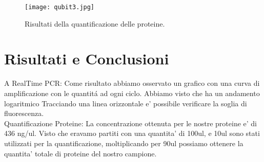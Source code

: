 \documentclass{article}
\begin{document}
\begin{figure}
  \texttt{[image: qubit3.jpg]}
  \caption{Risultati della quantificazione delle proteine.}
  \label{fig:qubit3}
\end{figure}

\section{Risultati e Conclusioni}
A
RealTime PCR:
Come risultato abbiamo osservato un grafico con una curva di amplificazione con le quantit\'a ad ogni ciclo.
Abbiamo visto che ha un andamento logaritmico
Tracciando una linea orizzontale e' possibile verificare la soglia di fluorescenza.\\

Quantificazione Proteine:
La concentrazione ottenuta per le nostre proteine e' di 436 ng/ul. Visto che eravamo partiti con una
quantita' di 100ul, e 10ul sono stati utilizzati per la quantificazione, moltiplicando per 90ul possiamo
ottenere la quantita' totale di proteine del nostro campione.
\end{document}

